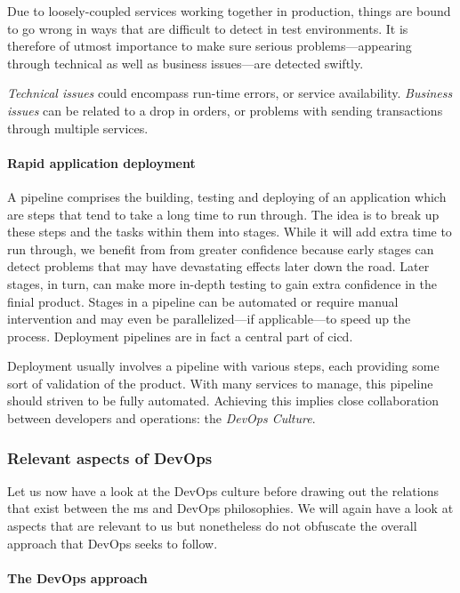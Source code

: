 Due to loosely-coupled services working together in production, things
are bound to go wrong in ways that are difficult to detect in test
environments. It is therefore of utmost importance to make sure
serious problems---appearing through technical as well as business
issues---are detected swiftly. \cite{ms-prereq}

\textit{Technical issues} could encompass run-time errors, or service
availability. \textit{Business issues} can be related to a drop in orders, or
problems with sending transactions through multiple services.
\cite{ms-prereq}

\paragraph{Rapid application deployment}

A pipeline comprises the building, testing and deploying of an
application which are steps that tend to take a long time to run
through. The idea is to break up these steps and the tasks within them
into stages. While it will add extra time to run through, we benefit
from from greater confidence because early stages can detect problems
that may have devastating effects later down the road. Later stages,
in turn, can make more in-depth testing to gain extra confidence in
the finial product. Stages in a pipeline can be automated or require
manual intervention and may even be parallelized---if applicable---to
speed up the process. Deployment pipelines are in fact a central part
of \gls{cicd}. \cite{pipelines}

Deployment usually involves a pipeline with various steps, each
providing some sort of validation of the product.  With many services
to manage, this pipeline should striven to be fully automated.
Achieving this implies close collaboration between
developers and operations: the \textit{DevOps Culture}. \cite{ms-prereq} 

\subsubsection{Relevant aspects of DevOps}

Let us now have a look at the DevOps culture before drawing out the
relations that exist between the \gls{ms} and DevOps philosophies.
 We will again have a look at aspects that
are relevant to us but nonetheless do not obfuscate the overall
approach that DevOps seeks to follow.

\paragraph{The DevOps approach}

